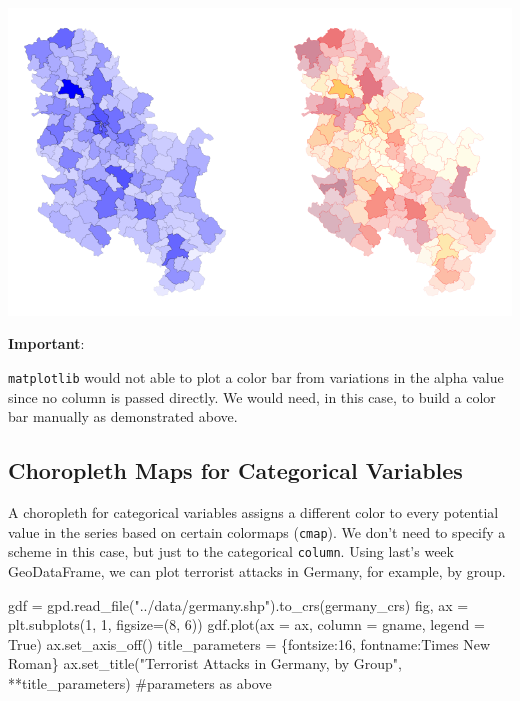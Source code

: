 \documentclass[
  letterpaper,
  DIV=11,
  numbers=noendperiod]{scrreprt}
\newenvironment{Shaded}{\begin{snugshade}}{\end{snugshade}}
\newcommand{\CommentTok}[1]{\textcolor[rgb]{0.37,0.37,0.37}{#1}}
\newcommand{\DecValTok}[1]{\textcolor[rgb]{0.68,0.00,0.00}{#1}}
\newcommand{\NormalTok}[1]{\textcolor[rgb]{0.00,0.23,0.31}{#1}}
\newcommand{\OperatorTok}[1]{\textcolor[rgb]{0.37,0.37,0.37}{#1}}
\newcommand{\StringTok}[1]{\textcolor[rgb]{0.13,0.47,0.30}{#1}}
\newcommand{\VariableTok}[1]{\textcolor[rgb]{0.07,0.07,0.07}{#1}}
\begin{document}
\includegraphics{labs/w02_maps_files/figure-pdf/cell-41-output-1.png}

\textbf{Important}:

\texttt{matplotlib} would not able to plot a color bar from variations
in the alpha value since no column is passed directly. We would need, in
this case, to build a color bar manually as demonstrated above.

\subsection{Choropleth Maps for Categorical
Variables}\label{choropleth-maps-for-categorical-variables}

A choropleth for categorical variables assigns a different color to
every potential value in the series based on certain colormaps
(\texttt{cmap}). We don't need to specify a scheme in this case, but
just to the categorical \texttt{column}. Using last's week GeoDataFrame,
we can plot terrorist attacks in Germany, for example, by group.

\begin{Shaded}
\begin{Highlighting}[]
\NormalTok{gdf }\OperatorTok{=}\NormalTok{ gpd.read\_file(}\StringTok{"../data/germany.shp"}\NormalTok{).to\_crs(germany\_crs)}
\NormalTok{fig, ax }\OperatorTok{=}\NormalTok{ plt.subplots(}\DecValTok{1}\NormalTok{, }\DecValTok{1}\NormalTok{, figsize}\OperatorTok{=}\NormalTok{(}\DecValTok{8}\NormalTok{, }\DecValTok{6}\NormalTok{))}
\NormalTok{gdf.plot(ax }\OperatorTok{=}\NormalTok{ ax, column }\OperatorTok{=} \StringTok{\textquotesingle{}gname\textquotesingle{}}\NormalTok{, legend }\OperatorTok{=} \VariableTok{True}\NormalTok{)}
\NormalTok{ax.set\_axis\_off()}
\NormalTok{title\_parameters }\OperatorTok{=}\NormalTok{ \{}\StringTok{\textquotesingle{}fontsize\textquotesingle{}}\NormalTok{:}\StringTok{\textquotesingle{}16\textquotesingle{}}\NormalTok{, }\StringTok{\textquotesingle{}fontname\textquotesingle{}}\NormalTok{:}\StringTok{\textquotesingle{}Times New Roman\textquotesingle{}}\NormalTok{\}}
\NormalTok{ax.set\_title(}\StringTok{"Terrorist Attacks in Germany, by Group"}\NormalTok{, }\OperatorTok{**}\NormalTok{title\_parameters) }\CommentTok{\#parameters as above}
\end{Highlighting}
\end{Shaded}
\end{document}
